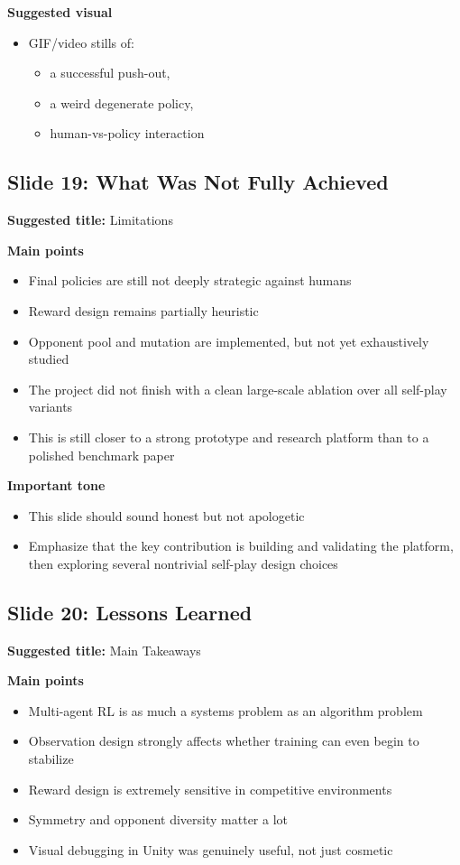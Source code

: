 \documentclass[11pt]{article}
\begin{document}
\textbf{Suggested visual}
\begin{itemize}
    \item GIF/video stills of:
    \begin{itemize}
        \item a successful push-out,
        \item a weird degenerate policy,
        \item human-vs-policy interaction
    \end{itemize}
\end{itemize}

\subsection*{Slide 19: What Was Not Fully Achieved}

\textbf{Suggested title:} Limitations

\textbf{Main points}
\begin{itemize}
    \item Final policies are still not deeply strategic against humans
    \item Reward design remains partially heuristic
    \item Opponent pool and mutation are implemented, but not yet exhaustively studied
    \item The project did not finish with a clean large-scale ablation over all self-play variants
    \item This is still closer to a strong prototype and research platform than to a polished benchmark paper
\end{itemize}

\textbf{Important tone}
\begin{itemize}
    \item This slide should sound honest but not apologetic
    \item Emphasize that the key contribution is building and validating the platform, then exploring several nontrivial self-play design choices
\end{itemize}

\subsection*{Slide 20: Lessons Learned}

\textbf{Suggested title:} Main Takeaways

\textbf{Main points}
\begin{itemize}
    \item Multi-agent RL is as much a systems problem as an algorithm problem
    \item Observation design strongly affects whether training can even begin to stabilize
    \item Reward design is extremely sensitive in competitive environments
    \item Symmetry and opponent diversity matter a lot
    \item Visual debugging in Unity was genuinely useful, not just cosmetic
\end{itemize}
\end{document}
